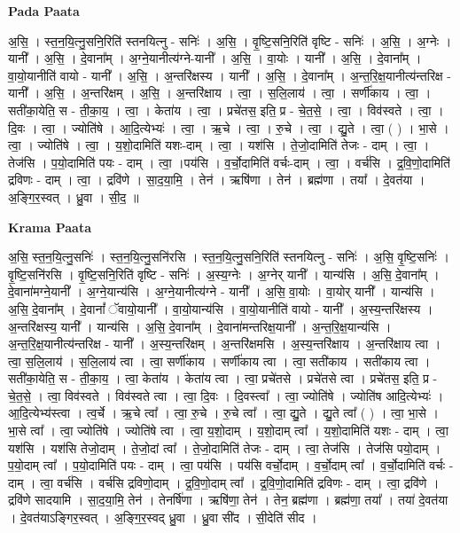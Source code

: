 \documentclass[17pt]{extarticle}
\begin{document}
\textbf{Pada Paata} \newline

अ॒सि॒ । स्त॒न॒यि॒त्नु॒सनि॒रिति॑ स्तनयित्नु - सनिः॑ । अ॒सि॒ । वृ॒ष्टि॒सनि॒रिति॑ वृष्टि - सनिः॑ । अ॒सि॒ । अ॒ग्नेः । यानी᳚ । अ॒सि॒ । दे॒वाना᳚म् । अ॒ग्ने॒यानीत्य॑ग्ने-यानी᳚ । अ॒सि॒ । वा॒योः । यानी᳚ । अ॒सि॒ । दे॒वाना᳚म् । वा॒यो॒यानीति॑ वायो - यानी᳚ । अ॒सि॒ । अ॒न्तरि॑क्षस्य । यानी᳚ । अ॒सि॒ । दे॒वाना᳚म् । अ॒न्त॒रि॒क्ष॒यानीत्य॑न्तरिक्ष - यानी᳚ । अ॒सि॒ । अ॒न्तरि॑क्षम् । अ॒सि॒ । अ॒न्तरि॑क्षाय । त्वा॒ । स॒लि॒लाय॑ । त्वा॒ । सर्णी॑काय । त्वा॒ । सती॑का॒येति॒ स - ती॒का॒य॒ । त्वा॒ । केता॑य । त्वा॒ । प्रचे॑तस॒ इति॒ प्र - चे॒त॒से॒ । त्वा॒ । विव॑स्वते । त्वा॒ । दि॒वः । त्वा॒ । ज्योति॑षे । आ॒दि॒त्येभ्यः॑ । त्वा॒ । ऋ॒चे । त्वा॒ । रु॒चे । त्वा॒ । द्यु॒ते । त्वा॒ ( ) । भा॒से । त्वा॒ । ज्योति॑षे । त्वा॒ । य॒शो॒दामिति॑ यशः-दाम् । त्वा॒ । यश॑सि । ते॒जो॒दामिति॑ तेजः - दाम् । त्वा॒ । तेज॑सि । प॒यो॒दामिति॑ पयः - दाम् । त्वा॒ ।पय॑सि । व॒र्चो॒दामिति॑ वर्चः-दाम् । त्वा॒ । वर्च॑सि । द्र॒वि॒णो॒दामिति॑ द्रविणः - दाम् । त्वा॒ । द्रवि॑णे । सा॒द॒या॒मि॒ । तेन॑ । ऋषि॑णा । तेन॑ । ब्रह्म॑णा । तया᳚ । दे॒वत॑या । अ॒ङ्गि॒र॒स्वत् । ध्रु॒वा । सी॒द॒ ॥  \newline


\textbf{Krama Paata} \newline

अ॒सि॒ स्त॒न॒यि॒त्नु॒सनिः॑ । स्त॒न॒यि॒त्नु॒सनि॑रसि । स्त॒न॒यि॒त्नु॒सनि॒रिति॑ स्तनयित्नु - सनिः॑ । अ॒सि॒ वृ॒ष्टि॒सनिः॑ । वृ॒ष्टि॒सनि॑रसि । वृ॒ष्टि॒सनि॒रिति॑ वृष्टि - सनिः॑ । अ॒स्य॒ग्नेः । अ॒ग्नेर् यानी᳚ । यान्य॑सि । अ॒सि॒ दे॒वाना᳚म् । दे॒वाना॑मग्ने॒यानी᳚ । अ॒ग्ने॒यान्य॑सि । अ॒ग्ने॒यानीत्य॑ग्ने - यानी᳚ । अ॒सि॒ वा॒योः । वा॒योर् यानी᳚ । यान्य॑सि । अ॒सि॒ दे॒वाना᳚म् । दे॒वानां᳚ ॅवायो॒यानी᳚ । वा॒यो॒यान्य॑सि । वा॒यो॒यानीति॑ वायो - यानी᳚ । अ॒स्य॒न्तरि॑क्षस्य । अ॒न्तरि॑क्षस्य॒ यानी᳚ । यान्य॑सि । अ॒सि॒ दे॒वाना᳚म् । दे॒वाना॑मन्तरिक्ष॒यानी᳚ । अ॒न्त॒रि॒क्ष॒यान्य॑सि । अ॒न्त॒रि॒क्ष॒यानीत्य॑न्तरिक्ष - यानी᳚ । अ॒स्य॒न्तरि॑क्षम् । अ॒न्तरि॑क्षमसि । अ॒स्य॒न्तरि॑क्षाय । अ॒न्तरि॑क्षाय त्वा । 
त्वा॒ स॒लि॒लाय॑ । स॒लि॒लाय॑ त्वा । त्वा॒ सर्णी॑काय । सर्णी॑काय त्वा । त्वा॒ सती॑काय । सती॑काय त्वा । सती॑का॒येति॒ स - ती॒का॒य॒ । त्वा॒ केता॑य । केता॑य त्वा । त्वा॒ प्रचे॑तसे । प्रचे॑तसे त्वा । प्रचे॑तस॒ इति॒ प्र - चे॒त॒से॒ । त्वा॒ विव॑स्वते । विव॑स्वते त्वा । त्वा॒ दि॒वः । दि॒वस्त्वा᳚ । त्वा॒ ज्योति॑षे । ज्योति॑ष आदि॒त्येभ्यः॑ । आ॒दि॒त्येभ्य॑स्त्वा । त्व॒र्चे । 
ऋ॒चे त्वा᳚ । त्वा॒ रु॒चे । रु॒चे त्वा᳚ । त्वा॒ द्यु॒ते । द्यु॒ते त्वा᳚ ( ) । 
त्वा॒ भा॒से । भा॒से त्वा᳚ । त्वा॒ ज्योति॑षे । ज्योति॑षे त्वा । त्वा॒ य॒शो॒दाम् । य॒शो॒दाम् त्वा᳚ । य॒शो॒दामिति॑ यशः - दाम् । त्वा॒ यश॑सि । यश॑सि तेजो॒दाम् । ते॒जो॒दां त्वा᳚ । ते॒जो॒दामिति॑ तेजः - दाम् । त्वा॒ तेज॑सि । तेज॑सि पयो॒दाम् । प॒यो॒दाम् त्वा᳚ । प॒यो॒दामिति॑ पयः - दाम् । त्वा॒ पय॑सि । पय॑सि वर्चो॒दाम् । व॒र्चो॒दाम् त्वा᳚ । व॒र्चो॒दामिति॑ वर्चः - दाम् । त्वा॒ वर्च॑सि । वर्च॑सि द्रविणो॒दाम् । द्र॒वि॒णो॒दाम् त्वा᳚ । द्र॒वि॒णो॒दामिति॑ द्रविणः - दाम् । त्वा॒ द्रवि॑णे । द्रवि॑णे सादयामि । सा॒द॒या॒मि॒ तेन॑ । तेनर्षि॑णा । ऋषि॑णा॒ तेन॑ । तेन॒ ब्रह्म॑णा । ब्रह्म॑णा॒ तया᳚ । तया॑ दे॒वत॑या । दे॒वत॑याऽङ्गिर॒स्वत् । अ॒ङ्गि॒र॒स्वद् ध्रु॒वा । ध्रु॒वा सी॑द । सी॒देति॑ सीद । \newline
\end{document}
